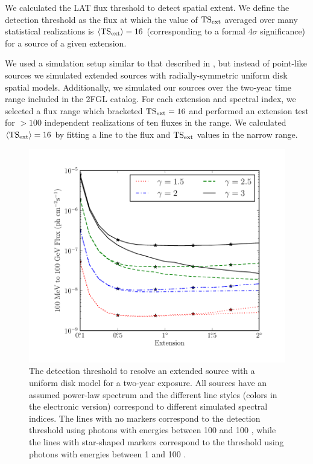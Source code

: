 We calculated the LAT flux threshold to detect spatial extent. We define
the detection threshold as the flux at which the value of $\mathrm{TS}_\mathrm{ext}$
averaged over many statistical realizations is $\langle\mathrm{TS}_\mathrm{ext}\rangle=16$
(corresponding to a formal $4\sigma$ significance) for a source of a
given extension.

We used a simulation setup similar to that described in
, but instead of point-like sources we
simulated extended sources with radially-symmetric uniform disk spatial
models. Additionally, we simulated our sources over the two-year time
range included in the 2FGL catalog.  For each extension and spectral
index, we selected a flux range which bracketed $\mathrm{TS}_\mathrm{ext}=16$ and performed
an extension test for $>100$ independent realizations of ten fluxes in
the range.  We calculated $\langle\mathrm{TS}_\mathrm{ext}\rangle=16$ by fitting a line
to the flux and $\mathrm{TS}_\mathrm{ext}$ values in the narrow range.

\begin{figure}[htbp]
    \includegraphics{chapters/extended_analysis/figures/mc_plots/index_sensitivity_color.pdf}
    \caption{The detection threshold to resolve an extended source with
    a uniform disk model for a two-year exposure.  All sources have an
    assumed power-law spectrum and the different line styles (colors in
    the electronic version) correspond to different simulated spectral
    indices.  The lines with no markers correspond to the detection
    threshold using photons with energies between 100 \mev and 100 \gev,
    while the lines with star-shaped markers correspond to the threshold
    using photons with energies between 1 \gev and 100 \gev.}
  \end{figure}

